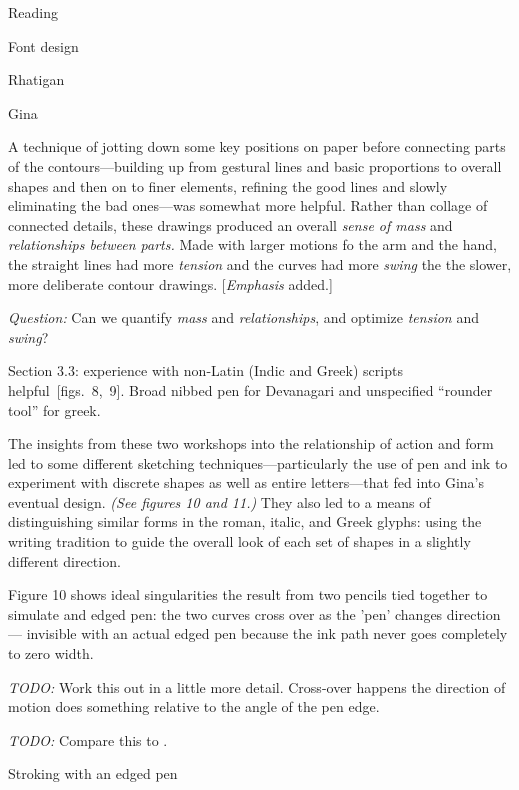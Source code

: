 \documentclass[12pt]{PalisadesLakesBook}
\begin{document}
\begin{plSection}{Reading}
\begin{plSection}{Font design}
\begin{plSection}{Rhatigan}
\begin{plSection}{Gina}
\begin{plSection}{}
\begin{plQuote}{}{}
A technique of jotting down some key positions on paper
before connecting parts of the contours---building up from gestural
lines and basic proportions to overall shapes 
and then on to finer elements, 
refining the good lines and slowly eliminating the bad ones---was
somewhat more helpful.
Rather than collage of connected details,
these drawings produced an overall \emph{sense of mass} 
and \emph{relationships between parts.}
Made with larger motions fo the arm and the hand,
the straight lines had more \emph{tension}
and the curves had more \emph{swing} 
the the slower, more deliberate contour drawings.
[\emph{Emphasis} added.]
\end{plQuote}

\emph{Question:}
Can we quantify \emph{mass} and \emph{relationships},
and optimize \emph{tension} and \emph{swing}?

Section 3.3: experience with non-Latin (Indic and Greek) 
scripts helpful~[figs.~8,~9]. Broad nibbed pen for Devanagari
and unspecified ``rounder tool'' for greek.

\begin{plQuote}{}{}
The insights from these two workshops into the relationship
of action and form led to some different sketching
techniques---particularly the use of pen and ink 
to experiment with discrete shapes as well as entire 
letters---that fed into Gina's eventual design.
\textit{(See figures 10 and 11.)}
They also led to a means of distinguishing similar forms
in the roman, italic, and Greek glyphs:
using the writing tradition to guide the overall look
of each set of shapes in a slightly different direction.
\end{plQuote}

Figure 10 shows ideal singularities the result from two pencils
tied together to simulate and edged pen: the two curves cross over
as the 'pen' changes direction --- invisible 
with an actual edged pen because the ink path never goes 
completely to zero width.

\emph{TODO:} Work this out in a little more detail. Cross-over
happens the direction of motion does something relative
to the angle of the pen edge.

\emph{TODO:} 
Compare this to .

\begin{plDiagram}{Stroking with an edged pen}{}
\end{plDiagram}


\end{plSection}
\end{plSection}
\end{plSection}
\end{plSection}
\end{plSection}
\end{document}
